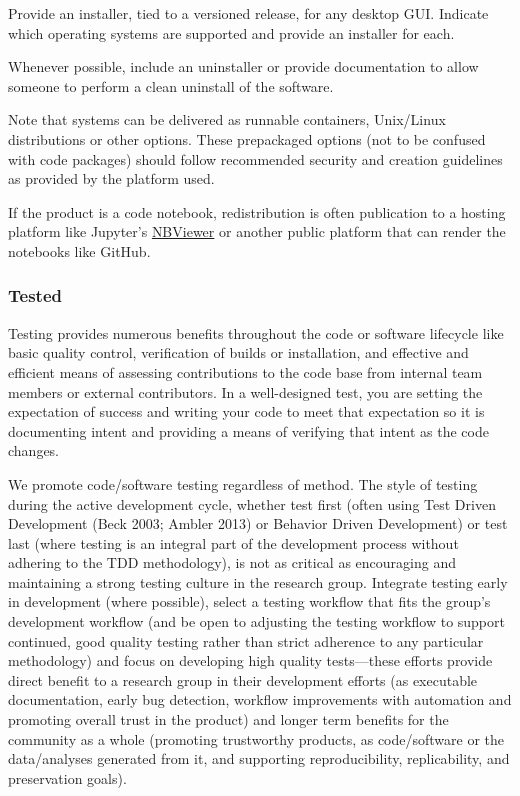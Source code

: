 \documentclass{article}
\newcounter{subsubsubsection}[subsubsection]
\begin{document}
Provide an installer, tied to a versioned release, for any desktop GUI. Indicate which operating systems are supported and provide an installer for each.
 
Whenever possible, include an uninstaller or provide documentation to allow someone to perform a clean uninstall of the software.
 
Note that systems can be delivered as runnable containers, Unix/Linux distributions or other options. These prepackaged options (not to be confused with code packages) should follow recommended security and creation guidelines as provided by the platform used. 
 
If the product is a code notebook, redistribution is often publication to a hosting platform like Jupyter’s \href{https://nbviewer.jupyter.org/} {NBViewer} or another public platform that can render the notebooks like GitHub.

\subsubsection{Tested}
Testing provides numerous benefits throughout the code or software lifecycle like basic quality control, verification of builds or installation, and effective and efficient means of assessing contributions to the code base from internal team members or external contributors. In a well-designed test, you are setting the expectation of success and writing your code to meet that expectation so it is documenting intent and providing a means of verifying that intent as the code changes.
 
We promote code/software testing regardless of method. The style of testing during the active development cycle, whether test first (often using Test Driven Development (Beck 2003; Ambler 2013) or Behavior Driven Development) or test last (where testing is an integral part of the development process without adhering to the TDD methodology), is not as critical as encouraging and maintaining a strong testing culture in the research group. Integrate testing early in development (where possible), select a testing workflow that fits the group’s development workflow (and be open to adjusting the testing workflow to support continued, good quality testing rather than strict adherence to any particular methodology) and focus on developing high quality tests—these efforts provide direct benefit to a research group in their development efforts (as executable documentation, early bug detection, workflow improvements with automation and promoting overall trust in the product) and longer term benefits for the community as a whole (promoting trustworthy products, as code/software or the data/analyses generated from it, and supporting reproducibility, replicability, and preservation goals). 
% 
% 
 
\end{document}

